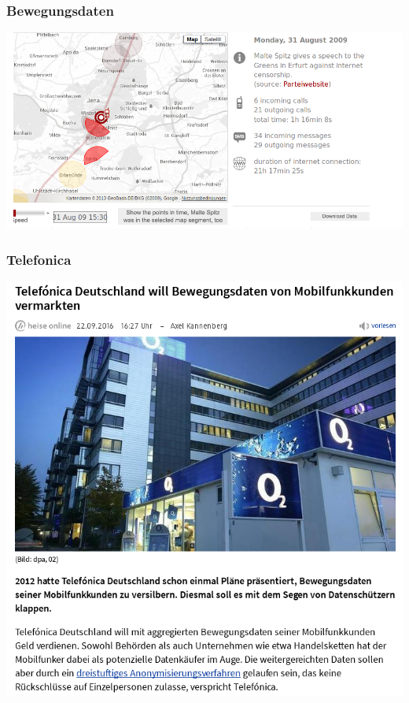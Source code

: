 \documentclass[12pt]{beamer}
\begin{document}
\begin{frame}
  \frametitle{Bewegungsdaten}
  \pause
  \begin{center}
    \includegraphics[height=0.7\textheight]{img/maltespitz.png}
  \end{center}
\end{frame}

\begin{frame}
  \frametitle{Telefonica}
  \pause
  \begin{center}
    \includegraphics[height=0.7\textheight]{img/telefonica.png}
  \end{center}
\end{frame}
\end{document}
